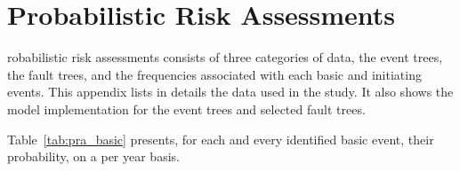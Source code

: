 %
%

\chapter{Probabilistic Risk Assessments}
\label{app:app03}

robabilistic risk assessments consists of three categories of data, the event trees, the fault trees, and the frequencies associated with each basic and initiating events. This appendix lists in details the data used in the study. It also shows the model implementation for the event trees and selected fault trees.

Table~\ref{tab:pra_basic} presents, for each and every identified basic event, their probability, on a per year basis.

